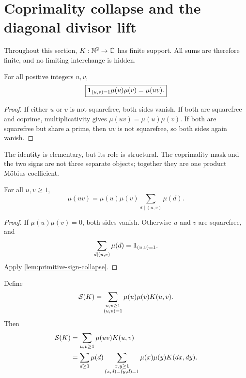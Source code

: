 \section{Coprimality collapse and the diagonal divisor lift}
\label{sec:divisor-lift}

Throughout this section, \(K:\mathbb N^2\to\mathbb C\) has finite support.  All
sums are therefore finite, and no limiting interchange is hidden.

\begin{lemma}
\label{lem:primitive-sign-collapse}
For all positive integers \(u,v\),
\begin{equation}
 \boxed{
 \mathbf 1_{(u,v)=1}\mu(u)\mu(v)=\mu(uv).}
\label{eq:primitive-sign-collapse}
\end{equation}
\end{lemma}

\begin{proof}
If either \(u\) or \(v\) is not squarefree, both sides vanish.  If both are
squarefree and coprime, multiplicativity gives
\(\mu(uv)=\mu(u)\mu(v)\).  If both are squarefree but share a prime, then
\(uv\) is not squarefree, so both sides again vanish.
\end{proof}

The identity is elementary, but its role is structural.  The coprimality
mask and the two signs are not three separate objects; together they are
one product M\"obius coefficient.

\begin{lemma}
\label{lem:coprimality-inversion}
For all \(u,v\ge1\),
\begin{equation}
 \mu(uv)
 =
 \mu(u)\mu(v)\sum_{d\mid(u,v)}\mu(d).
\label{eq:mu-product-inversion}
\end{equation}
\end{lemma}

\begin{proof}
If \(\mu(u)\mu(v)=0\), both sides vanish.  Otherwise \(u\) and \(v\) are
squarefree, and
\[
 \sum_{d\mid(u,v)}\mu(d)=\mathbf 1_{(u,v)=1}.
\]
Apply \cref{lem:primitive-sign-collapse}.
\end{proof}

\begin{theorem}
\label{thm:diagonal-divisor-lift}
Define
\[
 \mathcal S(K)
 =
 \sum_{\substack{u,v\ge1\\(u,v)=1}}
 \mu(u)\mu(v)K(u,v).
\]
Then
\begin{align}
 \mathcal S(K)
 &=
 \sum_{u,v\ge1}\mu(uv)K(u,v)
\label{eq:plane-as-product-mu}\\
 &=
 \sum_{d\ge1}\mu(d)
 \sum_{\substack{x,y\ge1\\(x,d)=(y,d)=1}}
 \mu(x)\mu(y)K(dx,dy).
\label{eq:exact-diagonal-lift}
\end{align}
\end{theorem}

